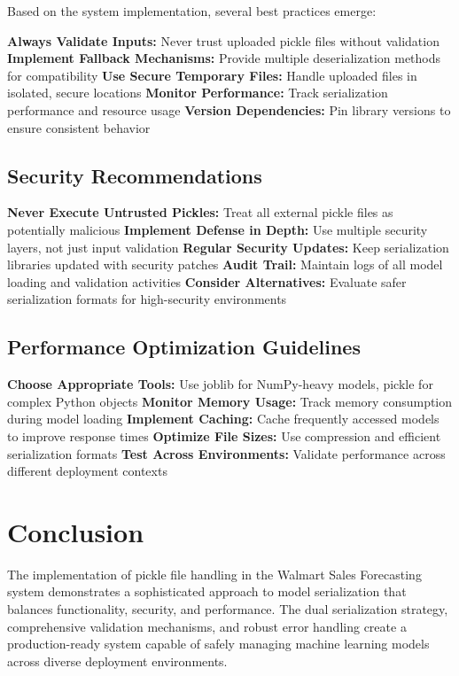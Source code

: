 Based on the system implementation, several best practices emerge:

\textbf{Always Validate Inputs:} Never trust uploaded pickle files without validation
\textbf{Implement Fallback Mechanisms:} Provide multiple deserialization methods for compatibility
\textbf{Use Secure Temporary Files:} Handle uploaded files in isolated, secure locations
\textbf{Monitor Performance:} Track serialization performance and resource usage
\textbf{Version Dependencies:} Pin library versions to ensure consistent behavior

\subsection{Security Recommendations}

\textbf{Never Execute Untrusted Pickles:} Treat all external pickle files as potentially malicious
\textbf{Implement Defense in Depth:} Use multiple security layers, not just input validation
\textbf{Regular Security Updates:} Keep serialization libraries updated with security patches
\textbf{Audit Trail:} Maintain logs of all model loading and validation activities
\textbf{Consider Alternatives:} Evaluate safer serialization formats for high-security environments

\subsection{Performance Optimization Guidelines}

\textbf{Choose Appropriate Tools:} Use joblib for NumPy-heavy models, pickle for complex Python objects
\textbf{Monitor Memory Usage:} Track memory consumption during model loading
\textbf{Implement Caching:} Cache frequently accessed models to improve response times
\textbf{Optimize File Sizes:} Use compression and efficient serialization formats
\textbf{Test Across Environments:} Validate performance across different deployment contexts

\section{Conclusion}

The implementation of pickle file handling in the Walmart Sales Forecasting system demonstrates a sophisticated approach to model serialization that balances functionality, security, and performance. The dual serialization strategy, comprehensive validation mechanisms, and robust error handling create a production-ready system capable of safely managing machine learning models across diverse deployment environments.

